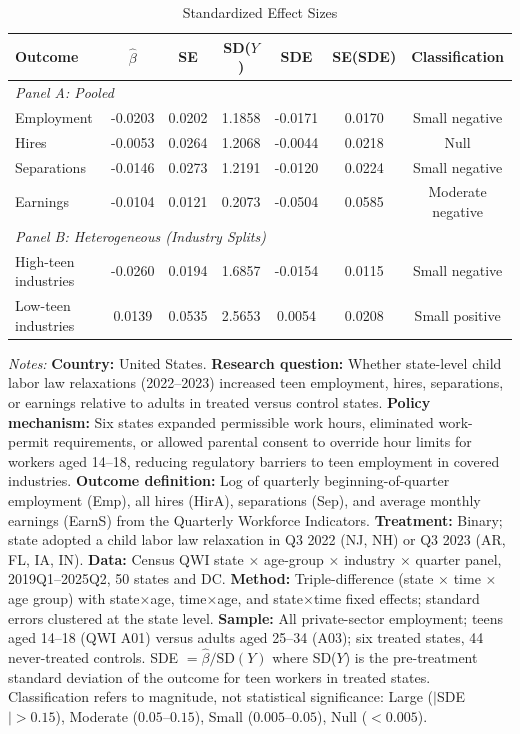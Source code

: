 \begin{table}[htbp]
\centering
\caption{Standardized Effect Sizes}
\label{tab:sde}
\begin{threeparttable}
\begin{tabular}{lcccccc}
\toprule
Outcome & $\hat{\beta}$ & SE & SD($Y$) & SDE & SE(SDE) & Classification \\
\midrule
\multicolumn{7}{l}{\textit{Panel A: Pooled}} \\
Employment & -0.0203 & 0.0202 & 1.1858 & -0.0171 & 0.0170 & Small negative \\
Hires & -0.0053 & 0.0264 & 1.2068 & -0.0044 & 0.0218 & Null \\
Separations & -0.0146 & 0.0273 & 1.2191 & -0.0120 & 0.0224 & Small negative \\
Earnings & -0.0104 & 0.0121 & 0.2073 & -0.0504 & 0.0585 & Moderate negative \\
\midrule
\multicolumn{7}{l}{\textit{Panel B: Heterogeneous (Industry Splits)}} \\
High-teen industries & -0.0260 & 0.0194 & 1.6857 & -0.0154 & 0.0115 & Small negative \\
Low-teen industries & 0.0139 & 0.0535 & 2.5653 & 0.0054 & 0.0208 & Small positive \\
\bottomrule
\end{tabular}
\begin{tablenotes}[flushleft]
\small
\item \textit{Notes:} \textbf{Country:} United States. \textbf{Research question:} Whether state-level child labor law relaxations (2022--2023) increased teen employment, hires, separations, or earnings relative to adults in treated versus control states. \textbf{Policy mechanism:} Six states expanded permissible work hours, eliminated work-permit requirements, or allowed parental consent to override hour limits for workers aged 14--18, reducing regulatory barriers to teen employment in covered industries. \textbf{Outcome definition:} Log of quarterly beginning-of-quarter employment (Emp), all hires (HirA), separations (Sep), and average monthly earnings (EarnS) from the Quarterly Workforce Indicators. \textbf{Treatment:} Binary; state adopted a child labor law relaxation in Q3 2022 (NJ, NH) or Q3 2023 (AR, FL, IA, IN). \textbf{Data:} Census QWI state $\times$ age-group $\times$ industry $\times$ quarter panel, 2019Q1--2025Q2, 50 states and DC. \textbf{Method:} Triple-difference (state $\times$ time $\times$ age group) with state$\times$age, time$\times$age, and state$\times$time fixed effects; standard errors clustered at the state level. \textbf{Sample:} All private-sector employment; teens aged 14--18 (QWI A01) versus adults aged 25--34 (A03); six treated states, 44 never-treated controls. SDE $= \hat{\beta} / \text{SD}(Y)$ where SD($Y$) is the pre-treatment standard deviation of the outcome for teen workers in treated states. Classification refers to magnitude, not statistical significance: Large ($|$SDE$| > 0.15$), Moderate ($0.05$--$0.15$), Small ($0.005$--$0.05$), Null ($< 0.005$).
\end{tablenotes}
\end{threeparttable}
\end{table}
